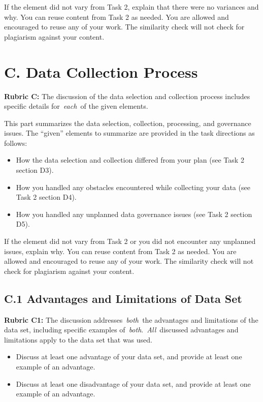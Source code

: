 If the element did not vary from Task 2, explain that there were no
variances and why. You can reuse content from Task 2 as needed. You are
allowed and encouraged to reuse any of your work. The similarity check
will not check for plagiarism against your content.

\hypertarget{c.-data-collection-process}{%
\section{C. Data Collection Process}\label{c.-data-collection-process}}

\textbf{Rubric C:} The discussion of the data selection and collection
process includes specific details for~\emph{each~}of the given elements.

This part summarizes the data selection, collection, processing, and
governance issues. The ``given'' elements to summarize are provided in
the task directions as follows:

\begin{itemize}
\item
  How the data selection and collection differed from your plan (see
  Task 2 section D3).
\item
  How you handled any obstacles encountered while collecting your data
  (see Task 2 section D4).
\item
  How you handled any unplanned data governance issues (see Task 2
  section D5).
\end{itemize}

If the element did not vary from Task 2 or you did not encounter any
unplanned issues, explain why. You can reuse content from Task 2 as
needed. You are allowed and encouraged to reuse any of your work. The
similarity check will not check for plagiarism against your content.

\hypertarget{c.1-advantages-and-limitations-of-data-set}{%
\subsection{C.1 Advantages and Limitations of Data
Set}\label{c.1-advantages-and-limitations-of-data-set}}

\textbf{Rubric C1:} The discussion addresses~\emph{both~}the advantages
and limitations of the data set, including specific examples
of~\emph{both}.~\emph{All}~discussed advantages and limitations apply to
the data set that was used.

\begin{itemize}
\item
  Discuss at least one advantage of your data set, and provide at least
  one example of an advantage.
\item
  Discuss at least one disadvantage of your data set, and provide at
  least one example of an advantage.
\end{itemize}

